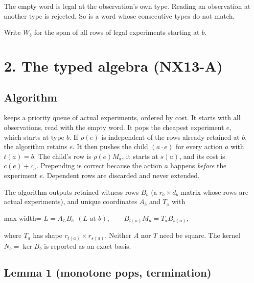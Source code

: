 \documentclass[
  11pt,
  a4paper,
]{report}
\let\singularitytexttt\texttt
\renewcommand{\texttt}[1]{\singularitytexttt{\seqsplit{#1}}}
\begin{document}
The empty word is legal at the observation's own type. Reading an
observation at another type is rejected. So is a word whose consecutive
types do not match.

Write \(W_b\) for the span of all rows of legal experiments starting at
\(b\).

\hypertarget{the-typed-algebra-nx13-a}{%
\section{2. The typed algebra (NX13-A)}\label{the-typed-algebra-nx13-a}}

\hypertarget{algorithm}{%
\subsection{Algorithm}\label{algorithm}}

\texttt{typed\_closure} keeps a priority queue of actual experiments,
ordered by cost. It starts with all observations, read with the empty
word. It pops the cheapest experiment \(e\), which starts at type \(b\).
If \(\rho(e)\) is independent of the rows already retained at \(b\), the
algorithm retains \(e\). It then pushes the child \((a\cdot e)\) for
every action \(a\) with \(t(a)=b\). The child's row is \(\rho(e)M_a\),
it starts at \(s(a)\), and its cost is \(c(e)+c_a\). Prepending is
correct because the action \(a\) happens \emph{before} the experiment
\(e\). Dependent rows are discarded and never extended.

The algorithm outputs retained witness rows \(B_b\) (a \(r_b\times d_b\)
matrix whose rows are actual experiments), and unique coordinates
\(A_b\) and \(T_a\) with

\begin{center}
\begin{adjustbox}{max width=\linewidth}
$\displaystyle
L=A_L B_b\ \ (L\text{ at }b),\qquad B_{t(a)}M_a=T_aB_{s(a)},
$
\end{adjustbox}
\end{center}

where \(T_a\) has shape \(r_{t(a)}\times r_{s(a)}\). Neither \(A\) nor
\(T\) need be square. The kernel \(N_b=\ker B_b\) is reported as an
exact basis.

\hypertarget{lemma-1-monotone-pops-termination}{%
\subsection{Lemma 1 (monotone pops,
termination)}\label{lemma-1-monotone-pops-termination}}
\end{document}
